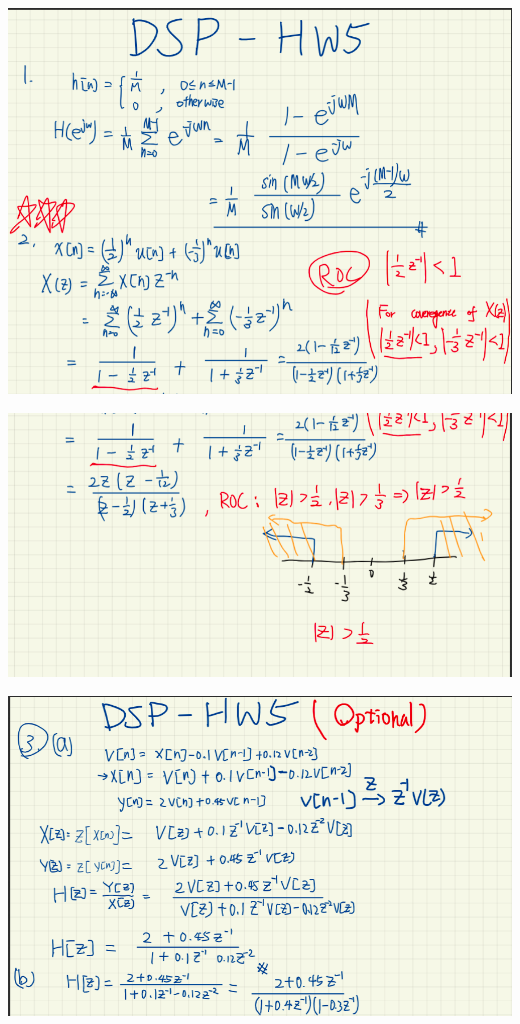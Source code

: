 \documentclass[a4paper]{article}
\begin{document}
	\begin{center}
		\includegraphics[width=1\linewidth]{screenshot043}
	\end{center}
	
	\begin{center}
		\includegraphics[width=1\linewidth]{screenshot044}
	\end{center}
	
	
	
	
	\begin{center}
		\includegraphics[width=1\linewidth]{screenshot045}
	\end{center}
	
\end{document}

